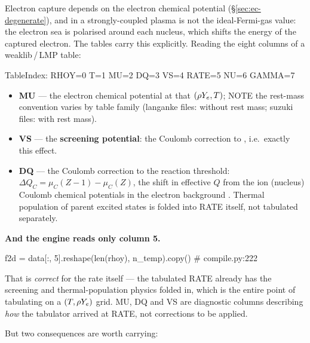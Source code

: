 Electron capture depends on the electron chemical potential \muE{}
(\S\ref{sec:ec-degenerate}), and \muE{} in a strongly-coupled plasma is not the
ideal-Fermi-gas value: the electron sea is polarised around each nucleus, which
shifts the energy of the captured electron. The tables carry this explicitly.
Reading the eight columns of a weaklib\,/\,LMP table:

\begin{srclisting}
TableIndex:  RHOY=0  T=1  MU=2  DQ=3  VS=4  RATE=5  NU=6  GAMMA=7
\end{srclisting}

\begin{itemize}
\item \textbf{MU} --- the electron chemical potential at that $(\rho Y_{e}, T)$;
      NOTE the rest-mass convention varies by table family (langanke files:
      without rest mass; suzuki files: with rest mass).
\item \textbf{VS} --- the \textbf{screening potential}: the Coulomb correction
      to \muE, i.e.\ exactly this effect.
\item \textbf{DQ} --- the Coulomb correction to the reaction threshold:
      $\Delta Q_C = \mu_C(Z-1) - \mu_C(Z)$, the shift in effective $Q$ from the
      ion (nucleus) Coulomb chemical potentials in the electron background
      \citep{suzuki2016}. Thermal population of parent excited states is folded
      into RATE itself, not tabulated separately.
\end{itemize}

\textbf{And the engine reads only column 5.}

\begin{srclisting}
f2d = data[:, 5].reshape(len(rhoy), n_temp).copy()     # compile.py:222
\end{srclisting}

That is \emph{correct} for the rate itself --- the tabulated RATE already has
the screening and thermal-population physics folded in, which is the entire
point of tabulating on a $(T, \rho Y_{e})$ grid. MU, DQ and VS are diagnostic
columns describing \emph{how} the tabulator arrived at RATE, not corrections to
be applied.

But two consequences are worth carrying:

